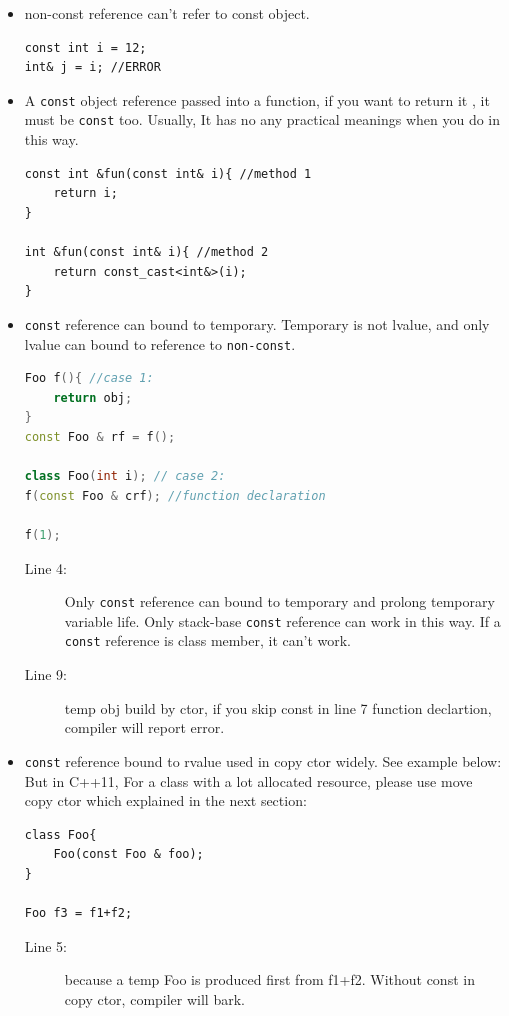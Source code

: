 \documentclass[a4paper,11pt,twoside]{book}
\begin{document}
\begin{itemize}
\item non-const reference can't refer to const object.
\begin{lstlisting}[numbers=none]
const int i = 12;
int& j = i; //ERROR
\end{lstlisting}

\item A \texttt{const} object reference passed into a function, if you want to return it , it must be \texttt{const} too. Usually, It has no any practical meanings when you do in this way. 
\begin{lstlisting}[numbers=none]
const int &fun(const int& i){ //method 1
	return i;
}

int &fun(const int& i){ //method 2
	return const_cast<int&>(i);
}
\end{lstlisting}

\item  \texttt{const} reference can bound to temporary. Temporary is not lvalue, and only lvalue can bound to reference to \texttt{non-const}.   
\begin{lstlisting}[frame=single, language=c++]
Foo f(){ //case 1:
	return obj;
}
const Foo & rf = f();

class Foo(int i); // case 2:
f(const Foo & crf); //function declaration

f(1);
\end{lstlisting}
\begin{description}
	\item[Line 4:] Only \texttt{const} reference can bound to temporary and prolong temporary variable life. Only stack-base \texttt{const} reference can work in this way. If a \texttt{const} reference is class member, it can't work. 
	
	\item[Line 9:] temp obj build by ctor, if you skip const in line 7 function declartion, compiler will report error.
\end{description}

	\item \texttt{const} reference bound to rvalue used in copy ctor widely. See example below: But in C++11, For a class with a lot allocated resource, please use move copy ctor which explained in the next section:

\begin{lstlisting}[numbers=none]
class Foo{
	Foo(const Foo & foo);
}

Foo f3 = f1+f2;
\end{lstlisting}
\begin{description}
	\item[Line 5:] because a temp Foo is produced first from f1+f2. Without const in copy ctor, compiler will bark.
\end{description}
\end{itemize}
\end{document}
